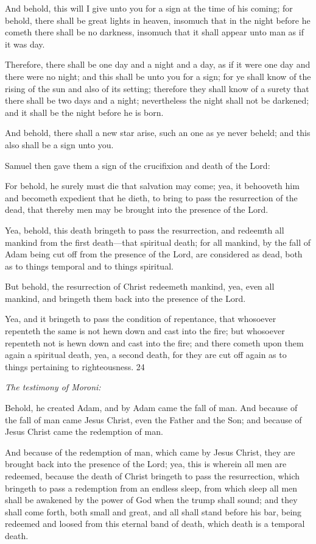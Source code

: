 And behold, this will I give unto you for a sign at the time of his coming; for behold, there
shall be great lights in heaven, insomuch that in the night before he cometh there shall be no
darkness, insomuch that it shall appear unto man as if it was day.

Therefore, there shall be one day and a night and a day, as if it were one day and there were
no night; and this shall be unto you for a sign; for ye shall know of the rising of the sun and
also of its setting; therefore they shall know of a surety that there shall be two days and a
night; nevertheless the night shall not be darkened; and it shall be the night before he is born.

And behold, there shall a new star arise, such an one as ye never beheld; and this also shall
be a sign unto you.

Samuel then gave them a sign of the crucifixion and death of the Lord:

For behold, he surely must die that salvation may come; yea, it behooveth him and becometh
expedient that he dieth, to bring to pass the resurrection of the dead, that thereby men may be
brought into the presence of the Lord.

Yea, behold, this death bringeth to pass the resurrection, and redeemth all mankind from the
first death—that spiritual death; for all mankind, by the fall of Adam being cut off from the
presence of the Lord, are considered as dead, both as to things temporal and to things
spiritual.

But behold, the resurrection of Christ redeemeth mankind, yea, even all mankind, and
bringeth them back into the presence of the Lord.

Yea, and it bringeth to pass the condition of repentance, that whosoever repenteth the same is
not hewn down and cast into the fire; but whosoever repenteth not is hewn down and cast
into the fire; and there cometh upon them again a spiritual death, yea, a second death, for
they are cut off again as to things pertaining to righteousness. 24

\textit{The testimony of Moroni:}

Behold, he created Adam, and by Adam came the fall of man. And because of the fall of man
came Jesus Christ, even the Father and the Son; and because of Jesus Christ came the
redemption of man.

And because of the redemption of man, which came by Jesus Christ, they are brought back
into the presence of the Lord; yea, this is wherein all men are redeemed, because the death of
Christ bringeth to pass the resurrection, which bringeth to pass a redemption from an endless
sleep, from which sleep all men shall be awakened by the power of God when the trump shall
sound; and they shall come forth, both small and great, and all shall stand before his bar,
being redeemed and loosed from this eternal band of death, which death is a temporal death.

